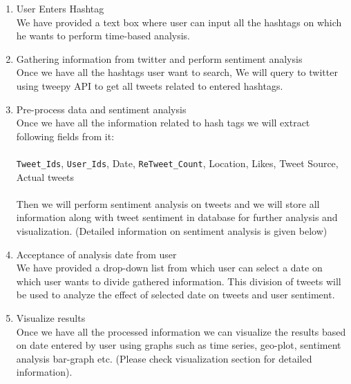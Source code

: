 \documentclass[journal, a4paper]{IEEEtran}
\begin{document}
   \begin{enumerate}
  \item User Enters Hashtag\\ We have provided a text box where user can input all the hashtags on which he wants to perform time-based analysis.
  
  \item Gathering information from twitter and perform sentiment analysis\\
Once we have all the hashtags user want to search, We will query to twitter using tweepy API to get all tweets related to entered  hashtags.

    \item Pre-process data and sentiment analysis\\
Once we have all the information related to hash tags we will extract following fields from it: \\ \\
\texttt{Tweet\_Ids}, \texttt{User\_Ids}, Date, \texttt{ReTweet\_Count}, Location, Likes, Tweet Source, Actual tweets\\ \\
Then we will perform sentiment analysis on tweets and we will store all information along with tweet sentiment in database for further analysis and visualization.
(Detailed information on sentiment analysis is given below)

	\item Acceptance of analysis date from user\\
We have provided a drop-down list from which user can select a date on which user wants to divide gathered information. This division of tweets will be used to analyze the effect of selected date on tweets and user sentiment.

    \item Visualize results\\
Once we have all the processed information we can visualize the results based on date entered by user using graphs such as time series, geo-plot, sentiment analysis bar-graph etc. (Please check visualization section for detailed information).
\end{enumerate}
\end{document}
